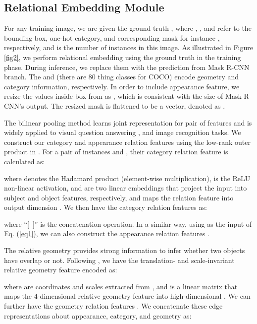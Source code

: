 \documentclass[letterpaper]{article} \usepackage{aaai20}  \usepackage{times}  \usepackage{helvet} \usepackage{courier}  \usepackage[hyphens]{url}  \usepackage{graphicx} \urlstyle{rm} \def\UrlFont{\rm}  \usepackage{graphicx}  \frenchspacing  \setlength{\pdfpagewidth}{8.5in}  \setlength{\pdfpageheight}{11in}
\begin{document}
\subsection{Relational Embedding Module}


For any training image, we are given the ground truth , where , , and  refer to the bounding box, one-hot category, and corresponding mask for instance , respectively, and  is the number of instances in this image. As illustrated in Figure \ref{fig2}, we perform relational embedding using the ground truth in the training phase. During inference, we replace them with the prediction from Mask R-CNN branch. The  and  (there are 80 thing classes for COCO) encode geometry and category information, respectively. In order to include appearance feature, we resize the values inside box  from  as , which is consistent with the size of Mask R-CNN's output. The resized mask is flattened to be a vector, denoted as .

The bilinear pooling method learns joint representation for pair of features and is widely applied to visual question answering \cite{kim2016hadamard,kim2018bilinear}, and image recognition \cite{yu2018hierarchical} tasks. We construct our category and appearance relation features using the low-rank outer product in \cite{kim2016hadamard}. For a pair of instances  and , their category relation feature is calculated as: 

where  denotes the Hadamard product (element-wise multiplication),  is the ReLU non-linear activation,  and  are two linear embeddings that project the input into subject and object features, respectively, and  maps the relation feature into output dimension . We then have the category relation features as:

where ``[\ ]'' is the concatenation operation. In a similar way, using  as the input of Eq. (\ref{eq1}), we can also construct the appearance relation features .

The relative geometry provides strong information to infer whether two objects have overlap or not. Following \cite{hu2018relation,woo2018linknet}, we have the translation- and scale-invariant relative geometry feature encoded as:

where  are coordinates and scales extracted from , and  is a linear matrix that maps the 4-dimensional relative geometry feature into high-dimensional . We can further have the geometry relation features . We concatenate these edge representations about appearance, category, and geometry as: 
\end{document}

